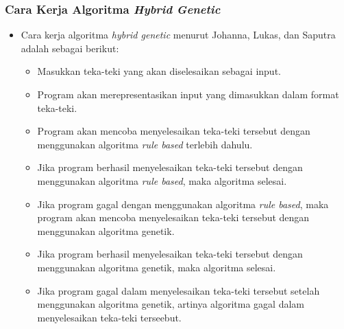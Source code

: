 \documentclass{beamer}
\begin{document}

\begin{frame}
\frametitle{Cara Kerja Algoritma \textit{Hybrid Genetic}}
\begin{itemize}
\item Cara kerja algoritma \textit{hybrid genetic} menurut Johanna, Lukas, dan Saputra adalah sebagai berikut:
	\begin{itemize}
	\item Masukkan teka-teki yang akan diselesaikan sebagai input.
	\item Program akan merepresentasikan input yang dimasukkan dalam format teka-teki.
	\item Program akan mencoba menyelesaikan teka-teki tersebut dengan menggunakan algoritma \textit{rule based} terlebih dahulu.
	\item Jika program berhasil menyelesaikan teka-teki tersebut dengan menggunakan algoritma \textit{rule based}, maka algoritma selesai.
	\item Jika program gagal dengan menggunakan algoritma \textit{rule based}, maka program akan mencoba menyelesaikan teka-teki tersebut dengan menggunakan algoritma genetik.
	\item Jika program berhasil menyelesaikan teka-teki tersebut dengan menggunakan algoritma genetik, maka algoritma selesai.
	\item Jika program gagal dalam menyelesaikan teka-teki tersebut setelah menggunakan algoritma genetik, artinya algoritma gagal dalam menyelesaikan teka-teki terseebut.
	\end{itemize}
\end{itemize}
\end{frame}
\end{document}
